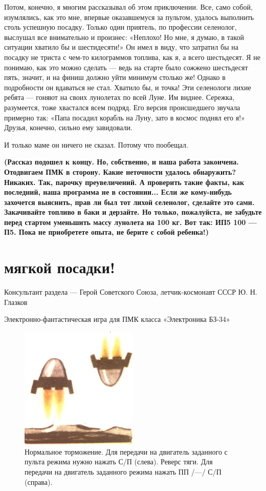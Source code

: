 \documentclass[11pt,a4paper,oneside]{article}
\begin{document}
Потом, конечно, я многим рассказывал об этом приключении. Все, само собой, изумлялись, как это мне, впервые оказавшемуся за пультом, удалось выполнить столь успешную посадку. Только один приятель, по профессии селенолог, выслушал все внимательно и произнес: «Неплохо! Но мне, я думаю, в такой ситуации хватило бы и шестидесяти!» Он имел в виду, что затратил бы на посадку не триста с чем-то килограммов топлива, как я, а всего шестьдесят. Я не понимаю, как это можно сделать — ведь на старте было сожжено шестьдесят пять, значит, и на финиш должно уйти минимум столько же! Однако в подробности он вдаваться не стал. Хватило бы, и точка! Эти селенологи лихие ребята — гоняют на своих лунолетах по всей Луне. Им виднее.
Сережка, разумеется, тоже хвастался всем подряд. Его версия происшедшего звучала примерно так: «Папа посадил корабль на Луну, зато в космос поднял его я!» Друзья, конечно, сильно ему завидовали.

И только маме он ничего не сказал. Потому что пообещал.

\textbf{
(Рассказ подошел к концу. Но, собственно, и наша работа закончена. Отодвигаем ПМК в сторону. Какие неточности удалось обнаружить? Никаких. Так, парочку преувеличений. А проверить такие факты, как последний, наша программа не в состоянии...
Если же кому-нибудь захочется выяснить, прав ли был тот лихой селенолог, сделайте это сами. Закачивайте топливо в баки и дерзайте. Но только, пожалуйста, не забудьте перед стартом уменьшить массу лунолета на 100 кг. Вот так: ИП5 100 — П5. Пока не приобретете опыта, не берите с собой ребенка!)}

\section{мягкой посадки!}
Консультант раздела — Герой Советского Союза, летчик-космонавт СССР Ю. Н. Глазков

Электронно-фантастическая игра для ПМК класса «Электроника БЗ-34»

\begin{figure}[h]
\includegraphics[width=0.5\textwidth]{lunolet1_orientation}
\caption{Нормальное торможение. Для передачи на двигатель заданного с пульта режима нужно нажать С/П (слева). Реверс тяги. Для передачи на двигатель заданного режима нажать ПП /—/ С/П (справа).}
\end{figure}
\end{document}

